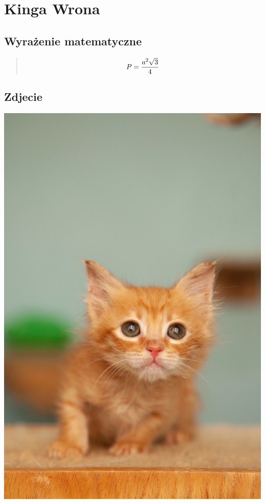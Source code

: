 \newpage
\section{Kinga Wrona}
\label{sec:kingawrona}

\subsection{Wyrażenie matematyczne}

\begin{quote}
\[P={a^2\sqrt{3}\over4}\]
\end{quote}

\subsection{Zdjecie}

\begin{center}
\includegraphics[scale=0.1]{Pictures/kotek} 
\end{center}

